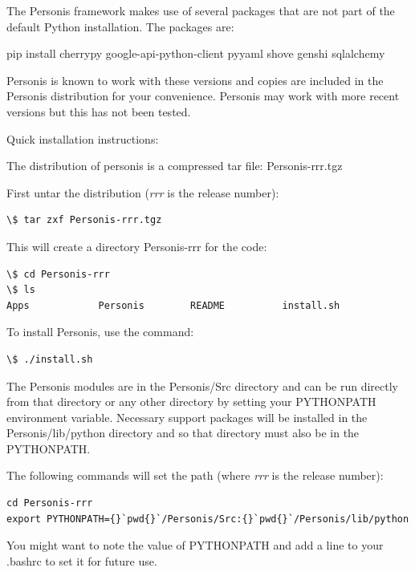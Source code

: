 \documentclass[letterpaper,10pt,english]{sphinxmanual}
\begin{document}
The Personis framework makes use of several packages that are not part
of the default Python installation.
The packages are:

pip install cherrypy google-api-python-client pyyaml shove genshi sqlalchemy

Personis is known to work with these versions and copies are included in
the Personis distribution for your convenience. Personis may work with
more recent versions but this has not been tested.

Quick installation instructions:

The distribution of personis is a compressed tar file: Personis-rrr.tgz

First untar the distribution (\emph{rrr} is the release number):

\begin{Verbatim}[commandchars=\\\{\}]
\$ tar zxf Personis-rrr.tgz
\end{Verbatim}

This will create a directory Personis-rrr for the code:

\begin{Verbatim}[commandchars=\\\{\}]
\$ cd Personis-rrr
\$ ls
Apps            Personis        README          install.sh
\end{Verbatim}

To install Personis, use the command:

\begin{Verbatim}[commandchars=\\\{\}]
\$ ./install.sh
\end{Verbatim}

The Personis modules are in the Personis/Src directory and can be run directly
from that directory or any other directory by setting your PYTHONPATH
environment variable.
Necessary support packages will be installed in the Personis/lib/python
directory and so that directory must also be in the PYTHONPATH.

The following commands will set the path (where \emph{rrr} is the release number):

\begin{Verbatim}[commandchars=\\\{\}]
cd Personis-rrr
export PYTHONPATH={}`pwd{}`/Personis/Src:{}`pwd{}`/Personis/lib/python
\end{Verbatim}

You might want to note the value of PYTHONPATH and add a line to
your .bashrc to set it for future use.
\end{document}
